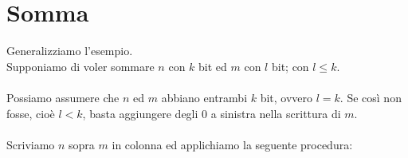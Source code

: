 \documentclass[a4paper,12pt, oneside]{book}
\begin{document}
\section{Somma}
Generalizziamo l'esempio.\\
Supponiamo di voler sommare $n$ con $k$ bit ed $m$ con $l$ bit; con $l \leq k$.\\\\
Possiamo assumere che $n$ ed $m$ abbiano entrambi $k$ bit, ovvero $l=k$. Se così non fosse, cioè $l<k$, basta aggiungere degli $0$ a sinistra nella scrittura di $m$.\\\\
Scriviamo $n$ sopra $m$ in colonna ed applichiamo la seguente procedura:
\end{document}
